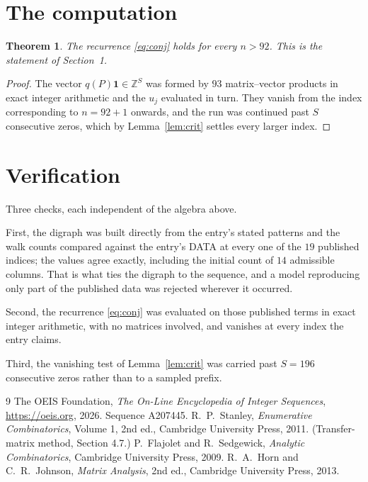 \documentclass[11pt,a4paper]{article}
\theoremstyle{plain}
\newtheorem{theorem}{Theorem}
\theoremstyle{definition}
\begin{document}
\section{The computation}

\begin{theorem}
The recurrence \eqref{eq:conj} holds for every $n>92$. This is the statement of
Section~1.
\end{theorem}

\begin{proof}
The vector $q(P)\mathbf{1}\in\mathbb{Z}^{S}$ was formed by $93$ matrix--vector
products in exact integer arithmetic and the $u_j$ evaluated in turn. They vanish from the
index corresponding to $n=92+1$ onwards, and the run was continued past $S$ consecutive
zeros, which by Lemma~\ref{lem:crit} settles every larger index.
\end{proof}

\section{Verification}

Three checks, each independent of the algebra above.

First, the digraph was built directly from the entry's stated patterns and the walk counts
compared against the entry's DATA at every one of the $19$ published indices; the
values agree exactly, including the initial count of $14$ admissible columns. That is
what ties the digraph to the sequence, and a model reproducing only part of the published
data was rejected wherever it occurred.

Second, the recurrence \eqref{eq:conj} was evaluated on those published terms in exact
integer arithmetic, with no matrices involved, and vanishes at every index the entry claims.

Third, the vanishing test of Lemma~\ref{lem:crit} was carried past $S=196$ consecutive
zeros rather than to a sampled prefix.

\begin{thebibliography}{9}
 The OEIS Foundation, \emph{The On-Line Encyclopedia of Integer
Sequences}, \url{https://oeis.org}, 2026. Sequence A207445.
 R.~P.~Stanley, \emph{Enumerative Combinatorics}, Volume 1, 2nd ed.,
Cambridge University Press, 2011. (Transfer-matrix method, Section 4.7.)
 P.~Flajolet and R.~Sedgewick, \emph{Analytic Combinatorics}, Cambridge
University Press, 2009.
 R.~A.~Horn and C.~R.~Johnson, \emph{Matrix Analysis}, 2nd ed., Cambridge
University Press, 2013.
\end{thebibliography}
\end{document}
